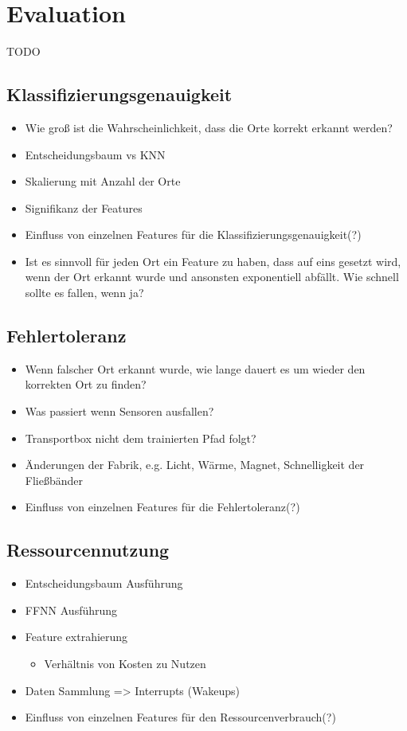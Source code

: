 \chapter{Evaluation}
TODO

\section{Klassifizierungsgenauigkeit}
\begin{itemize}
    \item Wie groß ist die Wahrscheinlichkeit, dass die Orte korrekt erkannt werden?
    \item Entscheidungsbaum vs KNN
    \item Skalierung mit Anzahl der Orte
    \item Signifikanz der Features
    \item Einfluss von einzelnen Features für die Klassifizierungsgenauigkeit(?)
    \item Ist es sinnvoll für jeden Ort ein Feature zu haben, dass auf eins gesetzt wird, wenn der Ort erkannt wurde und ansonsten exponentiell abfällt. Wie schnell sollte es fallen, wenn ja?
\end{itemize}

\section{Fehlertoleranz}
\begin{itemize}
    \item Wenn falscher Ort erkannt wurde, wie lange dauert es um wieder den korrekten Ort zu finden?
    \item Was passiert wenn Sensoren ausfallen?
    \item Transportbox nicht dem trainierten Pfad folgt?
    \item Änderungen der Fabrik, e.g. Licht, Wärme, Magnet, Schnelligkeit der Fließbänder
    \item Einfluss von einzelnen Features für die Fehlertoleranz(?)
\end{itemize}

\section{Ressourcennutzung}
\begin{itemize}
    \item Entscheidungsbaum Ausführung
    \item FFNN Ausführung
    \item Feature extrahierung
    \begin{itemize}
        \item Verhältnis von Kosten zu Nutzen
    \end{itemize}
    \item Daten Sammlung => Interrupts (Wakeups)
    \item Einfluss von einzelnen Features für den Ressourcenverbrauch(?)
\end{itemize}
